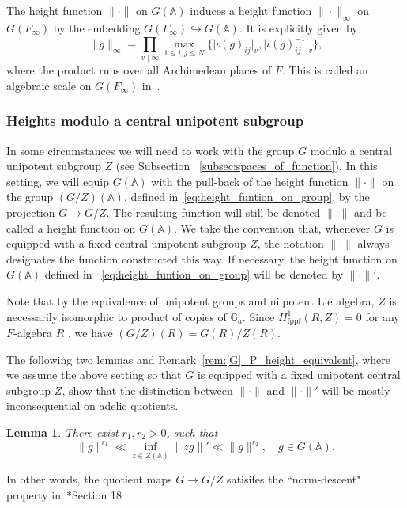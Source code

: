 \documentclass[letterpaper,11pt]{amsart}
\newcommand{\bA}{\mathbb{A}}
\newcommand{\bG}{\mathbb{G}}
\newcommand{\<}{\negthickspace}
\providecommand{\abs}[1]{\lvert#1\rvert}
\providecommand{\aabs}[1]{\lVert#1\rVert}
\theoremstyle{definition}
\theoremstyle{plain}
\newtheorem{lemma}[definition]{Lemma}
\theoremstyle{remark}
\numberwithin{equation}{section}
\begin{document}
The height function $\| \cdot \|$ on $G(\bA)$ induces a height function $\| \cdot \|_\infty$ on $G(F_\infty)$ by the embedding $G(F_\infty) \hookrightarrow G(\bA)$. It is explicitly given by
    \[
    \aabs{g}_\infty = \prod_{v \mid\infty} \max_{1 \leq i, j \leq N}
    \{ \abs{\iota(g)_{ij}}_v, \abs{\iota(g)^{-1}_{ij}}_v\},
    \]
where the product runs over all Archimedean places of $F$. This is called an
algebraic scale on $G(F_\infty)$ in~\cite{BK}.

\subsubsection{Heights modulo a central unipotent subgroup}
\label{subsubsec:central_unip}

In some circumstances we will need to work with the group $G$ modulo a central unipotent subgroup $Z$ (see Subsection ~\ref{subsec:spaces_of_function}). In this setting, we will equip $G(\bA)$ with the pull-back of the height function $\| \cdot \|$ on the group $(G/Z)(\bA)$, defined in~\eqref{eq:height_funtion_on_group}, by the projection $G \to G/Z$. The resulting function will still be denoted $\| \cdot \|$ and be called a height function on $G(\bA)$. We take the convention that, whenever $G$ is equipped with a fixed central unipotent subgroup $Z$, the notation $\| \cdot \|$ always designates the function constructed this way. If necessary, the height function on $G(\bA)$ defined in ~\eqref{eq:height_funtion_on_group} will be denoted by $\| \cdot \|'$.

Note that by the equivalence of unipotent groups and
nilpotent Lie algebra, $Z$ is necessarily isomorphic to product of copies of
$\bG_a$. Since $H^1_\mathrm{fppf}(R,Z) = 0$ for any $F$-algebra $R$ ,
we have $(G/Z)(R) = G(R)/Z(R)$.

The following two lemmas and Remark~\ref{rem:[G]_P_height_equivalent}, where we assume the above setting so that $G$ is equipped with a fixed unipotent central subgroup $Z$, show that the distinction between $\| \cdot \|$ and $\| \cdot \|'$ will be mostly inconsequential on adelic quotients.

\begin{lemma} \label{lem:norm_equivalent_quotient_center}
There exist $r_1,r_2>0$, such that
        \[
            \|g\|^{r_1} \ll  \inf_{z \in Z(\bA)} \|zg\|'  \ll \|g\|^{r_2}, \quad g \in G(\bA).
        \]
\end{lemma}
In other words, the quotient maps $G \to G/Z$ satisifes the ``norm-descent" property in~\cite{Kottwitz05}*{Section 18}
\end{document}
